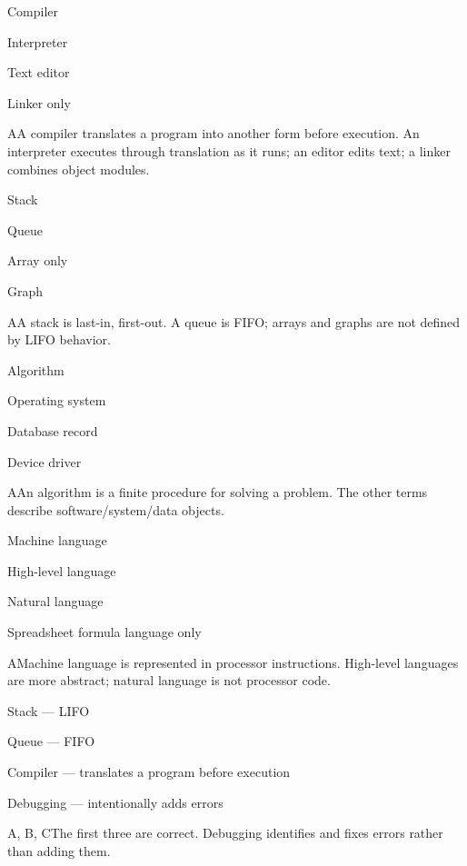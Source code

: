 \begin{enumerate}[label=\textbf{Q\arabic*.}, leftmargin=*]
  {\item Compiler
   \item Interpreter
   \item Text editor
   \item Linker only}
  {A}{A compiler translates a program into another form before execution. An interpreter executes through translation as it runs; an editor edits text; a linker combines object modules.}
  {\item Stack
   \item Queue
   \item Array only
   \item Graph}
  {A}{A stack is last-in, first-out. A queue is FIFO; arrays and graphs are not defined by LIFO behavior.}
  {\item Algorithm
   \item Operating system
   \item Database record
   \item Device driver}
  {A}{An algorithm is a finite procedure for solving a problem. The other terms describe software/system/data objects.}
  {\item Machine language
   \item High-level language
   \item Natural language
   \item Spreadsheet formula language only}
  {A}{Machine language is represented in processor instructions. High-level languages are more abstract; natural language is not processor code.}
  {\item Stack --- LIFO
   \item Queue --- FIFO
   \item Compiler --- translates a program before execution
   \item Debugging --- intentionally adds errors}
  {A, B, C}{The first three are correct. Debugging identifies and fixes errors rather than adding them.}
\fi
\ifnum{}

\end{enumerate}
